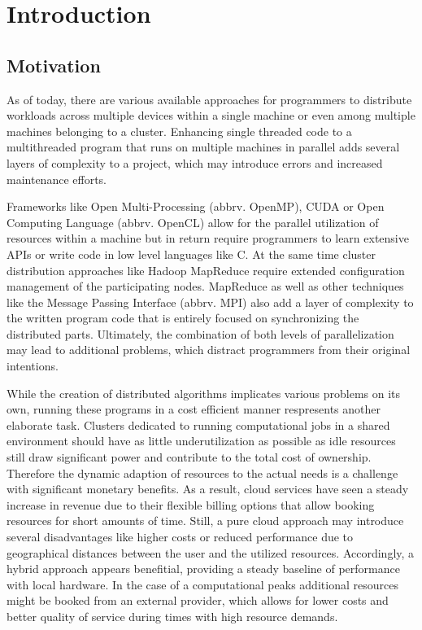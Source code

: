 \chapter{Introduction}

\section{Motivation}

As of today, there are various available approaches for programmers to distribute workloads across multiple devices within a single machine or even among multiple machines belonging to a cluster. Enhancing single threaded code to a multithreaded program that runs on multiple machines in parallel adds several layers of complexity to a project, which may introduce errors and increased maintenance efforts.

Frameworks like Open Multi-Processing (abbrv. OpenMP), CUDA or Open Computing Language (abbrv. OpenCL) allow for the parallel utilization of resources within a machine but in return require programmers to learn extensive APIs or write code in low level languages like C.
At the same time cluster distribution approaches like Hadoop MapReduce require extended configuration management of the participating nodes. MapReduce as well as other techniques like the Message Passing Interface (abbrv. MPI) also add a layer of complexity to the written program code that is entirely focused on synchronizing the distributed parts.
Ultimately, the combination of both levels of parallelization may lead to additional problems, which distract programmers from their original intentions.

While the creation of distributed algorithms implicates various problems on its own, running these programs in a cost efficient manner respresents another elaborate task. Clusters dedicated to running computational jobs in a shared environment should have as little underutilization as possible as idle resources still draw significant power and contribute to the total cost of ownership. Therefore the dynamic adaption of resources to the actual needs is a challenge with significant monetary benefits. As a result, cloud services have seen a steady increase in revenue due to their flexible billing options that allow booking resources for short amounts of time. Still, a pure cloud approach may introduce several disadvantages like higher costs or reduced performance due to geographical distances between the user and the utilized resources. Accordingly, a hybrid approach appears benefitial, providing a steady baseline of performance with local hardware. In the case of a computational peaks additional resources might be booked from an external provider, which allows for lower costs and better quality of service during times with high resource demands.

